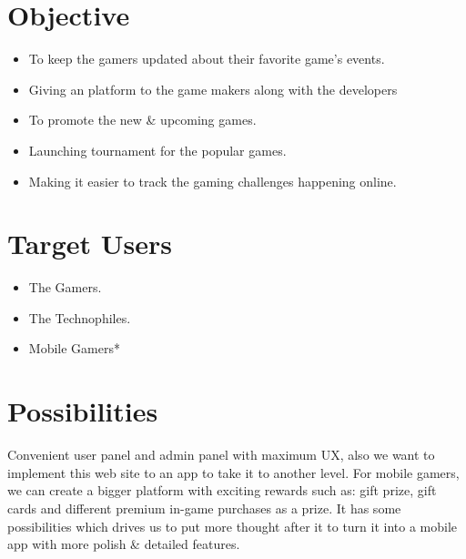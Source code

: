 \documentclass[11pt]{report}
\begin{document}
\section*{Objective}

\begin{itemize}
\item To keep the gamers updated about their favorite game’s events.
\item Giving an platform to the game makers along with the developers
\item To promote the new & upcoming games. 
\item Launching tournament for the popular games.
\item Making it easier to track the gaming challenges happening online.


\end{itemize}
\section*{Target Users}
\begin{itemize}
\item The Gamers.
\item The Technophiles.
\item Mobile Gamers*
\end{itemize}

\section*{Possibilities}
Convenient user panel and admin panel with maximum UX, also we want to implement this web site to an app to take it to another level. For mobile gamers, we can create a bigger platform with exciting rewards such as: gift prize, gift cards and different premium in-game purchases as a prize. It has some possibilities which drives us to put more thought after it to turn it into a mobile app with more polish & detailed features. 
\end{document}
